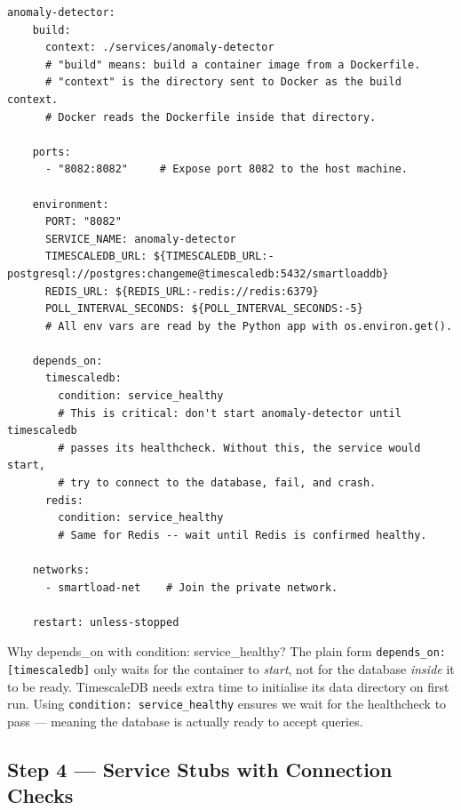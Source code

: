 \documentclass[12pt, a4paper]{article}
\begin{document}
\begin{lstlisting}[style=yaml, caption={docker-compose.yml --- AI service definition (anomaly-detector)}]
  anomaly-detector:
    build:
      context: ./services/anomaly-detector
      # "build" means: build a container image from a Dockerfile.
      # "context" is the directory sent to Docker as the build context.
      # Docker reads the Dockerfile inside that directory.

    ports:
      - "8082:8082"     # Expose port 8082 to the host machine.

    environment:
      PORT: "8082"
      SERVICE_NAME: anomaly-detector
      TIMESCALEDB_URL: ${TIMESCALEDB_URL:-postgresql://postgres:changeme@timescaledb:5432/smartloaddb}
      REDIS_URL: ${REDIS_URL:-redis://redis:6379}
      POLL_INTERVAL_SECONDS: ${POLL_INTERVAL_SECONDS:-5}
      # All env vars are read by the Python app with os.environ.get().

    depends_on:
      timescaledb:
        condition: service_healthy
        # This is critical: don't start anomaly-detector until timescaledb
        # passes its healthcheck. Without this, the service would start,
        # try to connect to the database, fail, and crash.
      redis:
        condition: service_healthy
        # Same for Redis -- wait until Redis is confirmed healthy.

    networks:
      - smartload-net    # Join the private network.

    restart: unless-stopped
\end{lstlisting}

\begin{importantbox}{Why depends\_on with condition: service\_healthy?}
The plain form \texttt{depends\_on: [timescaledb]} only waits for the container
to \textit{start}, not for the database \textit{inside} it to be ready. TimescaleDB
needs extra time to initialise its data directory on first run. Using
\texttt{condition: service\_healthy} ensures we wait for the healthcheck to pass
--- meaning the database is actually ready to accept queries.
\end{importantbox}

\subsection{Step 4 --- Service Stubs with Connection Checks}
\label{sec:stubs}
\end{document}

